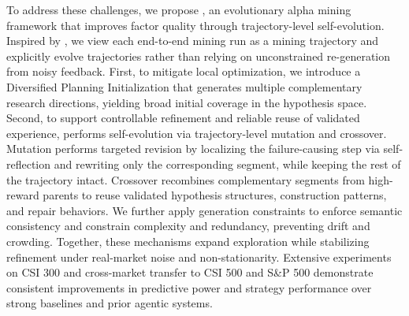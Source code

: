 To address these challenges, we propose \method, an evolutionary alpha mining framework that improves factor quality through trajectory-level self-evolution. Inspired by \cite{lin2025se}, we view each end-to-end mining run as a mining trajectory and explicitly evolve trajectories rather than relying on unconstrained re-generation from noisy feedback. First, to mitigate local optimization, we introduce a Diversified Planning Initialization that generates multiple complementary research directions, yielding broad initial coverage in the hypothesis space. Second, to support controllable refinement and reliable reuse of validated experience, \method performs self-evolution via trajectory-level mutation and crossover. Mutation performs targeted revision by localizing the failure-causing step via self-reflection and rewriting only the corresponding segment, while keeping the rest of the trajectory intact. Crossover recombines complementary segments from high-reward parents to reuse validated hypothesis structures, construction patterns, and repair behaviors. We further apply generation constraints to enforce semantic consistency and constrain complexity and redundancy, preventing drift and crowding. Together, these mechanisms expand exploration while stabilizing refinement under real-market noise and non-stationarity. Extensive experiments on CSI 300 and cross-market transfer to CSI 500 and S\&P 500 demonstrate consistent improvements in predictive power and strategy performance over strong baselines and prior agentic systems.